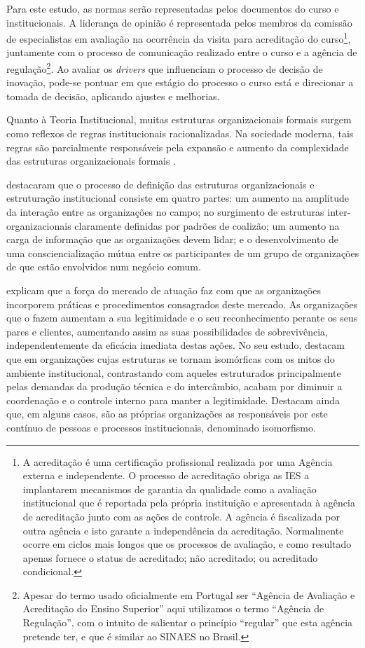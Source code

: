\documentclass{textolivre-html}
\begin{document}
Para este estudo, as normas serão representadas pelos documentos do curso e institucionais. A liderança de opinião é representada pelos membros da comissão de especialistas em avaliação na ocorrência da visita para acreditação do curso\footnote{A acreditação é uma certificação profissional realizada por uma Agência externa e independente. O processo de acreditação obriga as IES a implantarem mecanismos de garantia da qualidade como a avaliação institucional que é reportada pela própria instituição e apresentada à agência de acreditação junto com as ações de controle. A agência é fiscalizada por outra agência e isto garante a independência da acreditação. Normalmente ocorre em ciclos mais longos que os processos de avaliação, e como resultado apenas fornece o status de acreditado; não acreditado; ou acreditado condicional.}, juntamente com o processo de comunicação realizado entre o curso e a agência de regulação\footnote{Apesar do termo usado oficialmente em Portugal ser “Agência de Avaliação e Acreditação do Ensino Superior” aqui utilizamos o termo “Agência de Regulação”, com o intuito de salientar o princípio “regular” que esta agência pretende ter, e que é similar ao SINAES no Brasil.}. Ao avaliar os \textit{drivers} que influenciam o processo de decisão de inovação, pode-se pontuar em que estágio do processo o curso está e direcionar a tomada de decisão, aplicando ajustes e melhorias.

Quanto à Teoria Institucional, muitas estruturas organizacionais formais surgem como reflexos de regras institucionais racionalizadas. Na sociedade moderna, tais regras são parcialmente responsáveis pela expansão e aumento da complexidade das estruturas organizacionais formais \cite{meyer1977}.

\textcite[p. 148]{dimaggio1983} destacaram que o processo de definição das estruturas organizacionais e estruturação institucional consiste em quatro partes: um aumento na amplitude da interação entre as organizações no campo; no surgimento de estruturas inter-organizacionais claramente definidas por padrões de coalizão; um aumento na carga de informação que as organizações devem lidar; e o desenvolvimento de uma consciencialização mútua entre os participantes de um grupo de organizações de que estão envolvidos num negócio comum.

\textcite{meyer1977} explicam que a força do mercado de atuação faz com que as organizações incorporem práticas e procedimentos consagrados deste mercado. As organizações que o fazem aumentam a sua legitimidade e o seu reconhecimento perante os seus pares e clientes, aumentando assim as suas possibilidades de sobrevivência, independentemente da eficácia imediata destas ações.
No seu estudo, \textcite{meyer1977} destacam que em organizações cujas estruturas se tornam isomórficas com os mitos do ambiente institucional, contrastando com aqueles estruturados principalmente pelas demandas da produção técnica e do intercâmbio, acabam por diminuir a coordenação e o controle interno para manter a legitimidade. Destacam ainda que, em alguns casos, são as próprias organizações as responsáveis por este contínuo de pessoas e processos institucionais, denominado isomorfismo.
\end{document}
